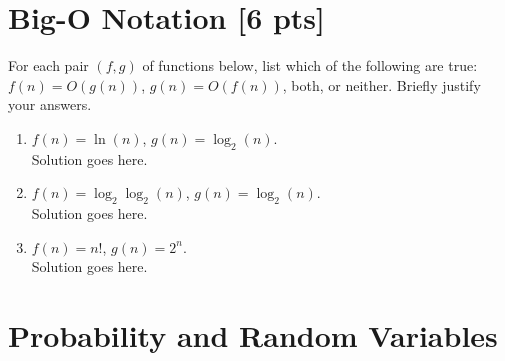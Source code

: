 \documentclass[a4paper]{article}
\theoremstyle{definition}
\newenvironment{soln}{
	\leavevmode\color{blue}\ignorespaces
}{}
\begin{document}
	
	\section{Big-O Notation [6 pts]}
	For each pair $(f, g)$ of functions below, list which of the following
	are true: $f(n) = O(g(n))$, $g(n) = O(f(n))$, both, or
	neither. Briefly justify your answers.
	\begin{enumerate}
		\item 	$f(n) = \ln(n)$, $g(n) = \log_{2}(n)$.\\
		\begin{soln}  Solution goes here. \end{soln}
		
		\item 	$f(n) =  \log_{2}\log_{2}(n)$, $g(n) = \log_{2}(n)$.\\
		\begin{soln}  Solution goes here. \end{soln}
		
		\item 	$f(n) = n!$, $g(n) = 2^n$.\\
		\begin{soln}  Solution goes here. \end{soln}
	\end{enumerate}
	
	
	
	
	
	\section{Probability and Random Variables }
\end{document}
